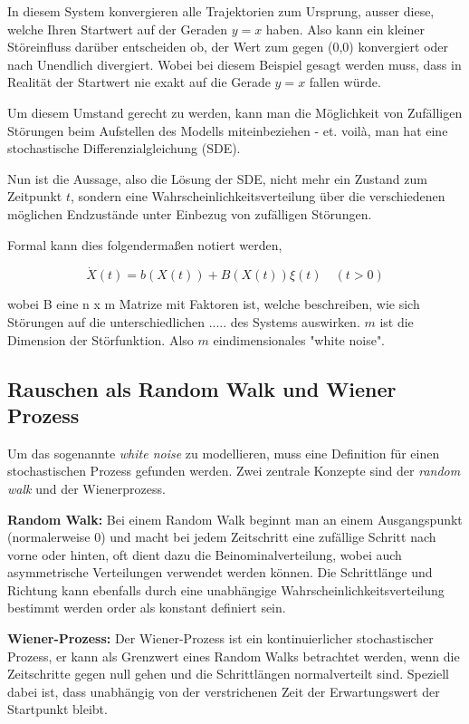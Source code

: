 In diesem System konvergieren alle Trajektorien zum Ursprung, ausser diese, welche Ihren Startwert auf der Geraden $ y = x $ haben. Also kann ein kleiner Störeinfluss darüber entscheiden ob, der Wert zum gegen (0,0) konvergiert oder nach Unendlich divergiert. Wobei bei diesem Beispiel gesagt werden muss, dass in Realität der Startwert nie exakt auf die Gerade $ y = x $ fallen würde.




Um diesem Umstand gerecht zu werden, kann man die Möglichkeit von Zufälligen Störungen beim Aufstellen des Modells miteinbeziehen - et. voilà, man hat eine stochastische Differenzialgleichung (SDE).

Nun ist die Aussage, also die Lösung der SDE, nicht mehr ein Zustand zum Zeitpunkt $ t $, sondern eine Wahrscheinlichkeitsverteilung über die verschiedenen möglichen Endzustände unter Einbezug von zufälligen Störungen.

Formal kann dies folgendermaßen notiert werden, 

\begin{equation}
\label{brown:SDGL:whiteNoise}
\dot{X}(t) = b(X(t)) + B(X(t))\xi(t) \quad (t>0)
\end{equation}

wobei B eine n x m Matrize mit Faktoren ist, welche beschreiben, wie sich Störungen auf die unterschiedlichen ..... des Systems auswirken. $ m $ ist die Dimension der Störfunktion. Also $ m $ eindimensionales "white noise".

\subsection{Rauschen als Random Walk und Wiener Prozess
\label{brown:SDGL:Wiener}}

Um das sogenannte \textit{white noise} zu modellieren, muss eine Definition für einen stochastischen Prozess gefunden werden. Zwei zentrale Konzepte sind der \textit{random walk} und der Wienerprozess.

\textbf{Random Walk:}
Bei einem Random Walk beginnt man an einem Ausgangspunkt (normalerweise 0) und macht bei jedem Zeitschritt eine zufällige Schritt nach vorne oder hinten, oft dient dazu die Beinominalverteilung, wobei auch asymmetrische Verteilungen verwendet werden können. Die Schrittlänge und Richtung kann ebenfalls durch eine unabhängige Wahrscheinlichkeitsverteilung bestimmt werden order als konstant definiert sein.

\textbf{Wiener-Prozess:}
Der Wiener-Prozess ist ein kontinuierlicher stochastischer Prozess, er kann als Grenzwert eines Random Walks betrachtet werden, wenn die Zeitschritte gegen null gehen und die Schrittlängen normalverteilt sind. Speziell dabei ist, dass unabhängig von der verstrichenen Zeit der Erwartungswert der Startpunkt bleibt.

